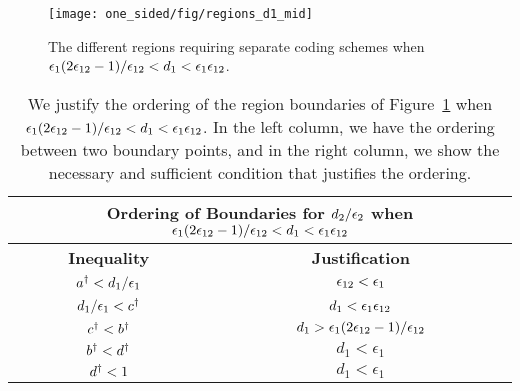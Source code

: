 \begin{figure}
	\centering
	\texttt{[image: one\_sided/fig/regions\_d1\_mid]}
	\caption{The different regions requiring separate coding schemes when $\epsilon_1 (2\epsilon_{12} - 1)/\epsilon_{12} < d_1 < \epsilon_1\epsilon_{12}$.}
	\label{fig:regions_d1_mid}
\end{figure}

\begin{table}
	\begin{center}
		\begin{tabular}{| c | c |}
			\hline
			\multicolumn{2}{|c|}{{\bf Ordering of Boundaries for $d_2/\epsilon_2$ when $\epsilon_1 (2\epsilon_{12} - 1)/\epsilon_{12} < d_1 < \epsilon_1\epsilon_{12}$}} \\
			\hline
			{\bf Inequality} & {\bf Justification}   \\ \hline
			$a^{\dagger} < d_1/\epsilon_1$ & $\epsilon_{12} < \epsilon_1$ \\ \hline 
			$d_1/\epsilon_1 < c^{\dagger} $ & $d_1 < \epsilon_1\epsilon_{12}$ \\ \hline 
			$c^{\dagger} < b^{\dagger} $ & $d_1 > \epsilon_1 (2\epsilon_{12} - 1)/\epsilon_{12}$ \\ \hline 			
			$b^{\dagger} < d^{\dagger}$ & $d_1 < \epsilon_1$ \\ \hline 
			$d^{\dagger} < 1$ & $d_1 < \epsilon_1$ \\
			\hline
		\end{tabular}
	\end{center}
	\caption{We justify the ordering of the region boundaries of Figure~\ref{fig:regions_d1_mid} when $\epsilon_1 (2\epsilon_{12} - 1)/\epsilon_{12} < d_1 < \epsilon_1\epsilon_{12}$.  In the left column, we have the ordering between two boundary points, and in the right column, we show the necessary and sufficient condition that justifies the ordering.}	
	\label{tab:d1_mid}	
\end{table}
